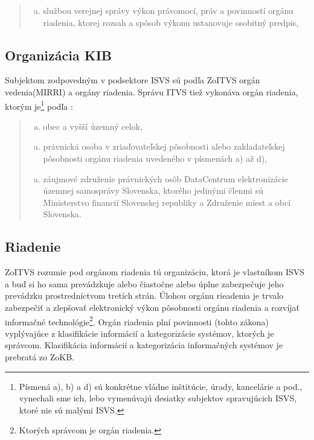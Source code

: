 \begin{quote}
  \begin{enumerate}[k)]
    \item službou verejnej správy výkon právomocí, práv a povinností orgánu riadenia, ktorej rozsah a spôsob výkonu ustanovuje
      osobitný predpis, 
  \end{enumerate}
\end{quote}

\subsection{Organizácia KIB}
Subjektom zodpovedným v podsektore ISVS sú podľa ZoITVS orgán vedenia(MIRRI) a orgány riadenia. Správu ITVS tiež vykonáva
orgán riadenia, ktorým je\footnote{Písmená a), b) a d) sú konkrétne vládne inštitúcie, úrady, kancelárie a pod.,
vynechali sme ich, lebo vymenúvajú desiatky subjektov spravujúcich ISVS, ktoré nie sú malými \acrshort{ISVS}.}
podľa \cite[\S 5, ods. (2)]{95/2019}: 

\begin{quote}
  \begin{enumerate}[c)]
    \item obec a vyšší územný celok,
  \end{enumerate}
  \begin{enumerate}[e)]
    \item právnická osoba v zriaďovateľskej pôsobnosti alebo zakladateľskej pôsobnosti orgánu riadenia uvedeného v písmenách
      a) až d), 
  \end{enumerate}
  \begin{enumerate}[h)]
    \item záujmové združenie právnických osôb DataCentrum elektronizácie územnej samosprávy Slovenska, ktorého jedinými členmi
      sú Ministerstvo financií Slovenskej republiky a Združenie miest a obcí Slovenska.
  \end{enumerate}
\end{quote}

\subsection{Riadenie}

ZoITVS rozumie pod orgánom riadenia tú organizáciu, ktorá je vlastníkom ISVS a buď si ho sama prevádzkuje alebo čiastočne
alebo úplne zabezpečuje jeho prevádzku prostredníctvom tretích strán. Úlohou orgánu rieadenia je trvalo zabezpečiť a zlepšovať
elektronický výkon pôsobnosti orgánu riadenia a rozvíjať informačné technológie\footnote{Ktorých správcom je orgán riadenia.}.
Orgán riadenia plní povinnosti (tohto zákona) vyplývajúce z klasifikácie informácií a kategorizácie systémov, ktorých je
správcom. Klasifikácia informácií a kategorizácia informačných systémov je prebratá zo \acrshort{ZoKB}. 

